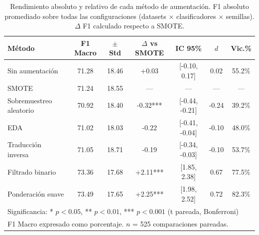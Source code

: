 \begin{table}[htbp]
\centering
\small
\caption{Rendimiento absoluto y relativo de cada método de aumentación. F1 absoluto promediado sobre todas las configuraciones (datasets $\times$ clasificadores $\times$ semillas). $\Delta$ F1 calculado respecto a SMOTE.}
\label{tab:absolute_f1_by_method}
\begin{tabular}{lcccccc}
\toprule
\textbf{Método} & \textbf{F1 Macro} & \textbf{$\pm$ Std} & \textbf{$\Delta$ vs SMOTE} & \textbf{IC 95\%} & \textbf{$d$} & \textbf{Vic.\%} \\
\midrule
Sin aumentación & 71.28 & 18.46 & +0.03 & [-0.10, 0.17] & 0.02 & 55.2\% \\
SMOTE & 71.24 & 18.55 & --- & --- & --- & --- \\
Sobremuestreo aleatorio & 70.92 & 18.40 & -0.32*** & [-0.44, -0.21] & -0.24 & 39.2\% \\
EDA & 71.02 & 18.03 & -0.22 & [-0.41, -0.04] & -0.10 & 48.0\% \\
Traducción inversa & 71.05 & 18.71 & -0.19 & [-0.34, -0.03] & -0.10 & 53.7\% \\
Filtrado binario & 73.36 & 17.68 & +2.11*** & [1.85, 2.38] & 0.67 & 77.5\% \\
Ponderación suave & 73.49 & 17.65 & +2.25*** & [1.98, 2.52] & 0.72 & 82.3\% \\
\midrule
\multicolumn{7}{l}{\small Significancia: * $p<0.05$, ** $p<0.01$, *** $p<0.001$ (t pareada, Bonferroni)} \\
\multicolumn{7}{l}{\small F1 Macro expresado como porcentaje. $n$ = 525 comparaciones pareadas.} \\
\bottomrule
\end{tabular}
\end{table}
